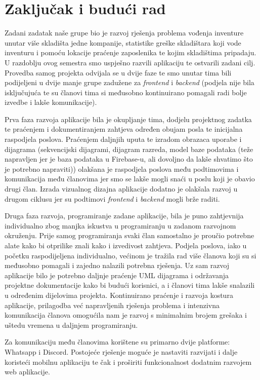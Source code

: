 \chapter{Zaključak i budući rad}
		
		 
		 Zadani zadatak naše grupe bio je razvoj rješenja problema vođenja inventure unutar više skladišta jedne kompanije, statistike greške skladištara koji vode inventuru i pomoću lokacije praćenje zaposlenika te kojim skladištima pripadaju. U razdoblju ovog semestra smo uspješno razvili aplikaciju te ostvarili zadani cilj. Provedba samog projekta odvijala se u dvije faze te smo unutar tima bili podijeljeni u dvije manje grupe zadužene za \textit{frontend} i \textit{backend} (podjela nije bila isključujuća te su članovi tima si međusobno kontinuirano pomagali radi bolje izvedbe i lakše komunikacije).
		 	
		 Prva faza razvoja aplikacije bila je okupljanje tima, dodjelu projektnog zadatka te praćenjem i dokumentiranjem zahtjeva određen obujam posla te inicijalna raspodjela poslova. Praćenjem daljnjih uputa te izradom obrazaca uporabe i dijagrama (sekvencijski dijagrami, dijagram razreda, model baze podataka (teže napravljen jer je baza podataka u Firebase-u, ali dovoljno da lakše shvatimo što je potrebno napraviti)) olakšana je raspodjela poslova među podtimovima i komunikacija među članovima jer smo se lakše mogli snaći u poslu koji je obavio drugi član. Izrada vizualnog dizajna aplikacije dodatno je olakšala razvoj u drugom ciklusu jer su podtimovi \textit{frontend} i \textit{backend} mogli brže raditi.
		 
		 Druga faza razvoja, programiranje zadane aplikacije, bila je puno zahtjevnija individualno zbog manjka iskustva u programiranju u zadanom razvojnom okruženju. Prije samog programiranja svaki član samostalno je proučio potrebne alate kako bi otprilike znali kako i izvedivost zahtjeva. Podjela poslova, iako u početku raspodijeljena individualno, većinom je tražila rad više članova koji su si međusobno pomagali i zajedno nalazili potrebna rješenja. Uz sam razvoj aplikacije bilo je potrebno daljnje praćenje UML dijagrama i održavanja projektne dokumentacije kako bi budući korisnici, a i članovi tima lakše snalazili u određenim dijelovima projekta. Kontinuirano praćenje i razvoja kostura aplikacije, prilagodba već napravljenih rješenja problema i intenzivna komunikacija članova omogućila nam je razvoj s minimalnim brojem grešaka i uštedu vremena u daljnjem programiranju.
		 
		 Za komunikaciju među članovima korištene su primarno dvije platforme: Whatsapp i Discord. Postojeće rješenje moguće je nastaviti razvijati i dalje koristeći mobilnu aplikaciju te čak i proširiti funkcionalnost dodatnim razvojem web aplikacije.
		 
